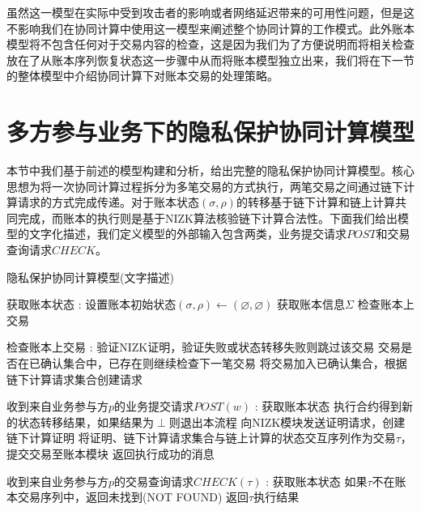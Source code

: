 虽然这一模型在实际中受到攻击者的影响或者网络延迟带来的可用性问题，但是这不影响我们在协同计算中使用这一模型来阐述整个协同计算的工作模式。此外账本模型将不包含任何对于交易内容的检查，这是因为我们为了方便说明而将相关检查放在了从账本序列恢复状态这一步骤中从而将账本模型独立出来，我们将在下一节的整体模型中介绍协同计算下对账本交易的处理策略。

\section{多方参与业务下的隐私保护协同计算模型}
本节中我们基于前述的模型构建和分析，给出完整的隐私保护协同计算模型。核心思想为将一次协同计算过程拆分为多笔交易的方式执行，两笔交易之间通过链下计算请求的方式完成传递。对于账本状态$(\sigma, \rho)$的转移基于链下计算和链上计算共同完成，而账本的执行则是基于NIZK算法核验链下计算合法性。下面我们给出模型的文字化描述，我们定义模型的外部输入包含两类，业务提交请求$POST$和交易查询请求$CHECK$。
\begin{breakablealgorithm}
    \caption{隐私保护协同计算模型(文字描述)}
    \label{alg:ch3-5}
    \begin{algorithmic} 
        \item[获取账本状态]: 
        \STATE 设置账本初始状态$(\sigma, \rho) \leftarrow (\varnothing, \varnothing)$
        \STATE 获取账本信息$\Sigma$
        \STATE 检查账本上交易
        \item[检查账本上交易]:
        \STATE 验证NIZK证明，验证失败或状态转移失败则跳过该交易
        \STATE 交易是否在已确认集合中，已存在则继续检查下一笔交易
        \STATE 将交易加入已确认集合，根据链下计算请求集合创建请求

        \item[收到来自业务参与方$p$的业务提交请求$POST(w)$]:
        \STATE 获取账本状态
        \STATE 执行合约得到新的状态转移结果，如果结果为$\perp$则退出本流程
        \STATE 向NIZK模块发送证明请求，创建链下计算证明
        \STATE 将证明、链下计算请求集合与链上计算的状态交互序列作为交易$\tau$，提交交易至账本模块
        \STATE 返回执行成功的消息

        \item[收到来自业务参与方$p$的交易查询请求$CHECK(\tau)$]:
        \STATE 获取账本状态
        \STATE 如果$\tau$不在账本交易序列中，返回未找到(NOT FOUND)
        \STATE 返回$\tau$执行结果
    \end{algorithmic}
\end{breakablealgorithm}

